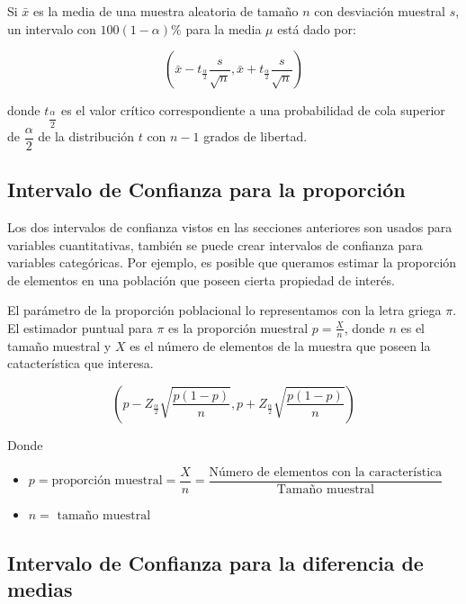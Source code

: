 \documentclass[letterpaper,]{book}
\begin{document}
Si \(\bar{x}\) es la media de una muestra aleatoria de tamaño \(n\) con desviación muestral \(s\), un intervalo con \(100\left(1-\alpha\right)\%\) para la media \(\mu\) está dado por:

\begin{equation} 
  \left(\bar{x} - t_{\frac{\alpha}{2}}\dfrac{s}{\sqrt{n}}, \bar{x} + t_{\frac{\alpha}{2}}\dfrac{s}{\sqrt{n}}  \right)
  \label{eq:icmusd}
\end{equation}

donde \(t_{\dfrac{\alpha}{2}}\) es el valor crítico correspondiente a una probabilidad de cola superior de \(\dfrac{\alpha}{2}\) de la distribución \(t\) con \(n-1\) grados de libertad.

\hypertarget{intervalo-de-confianza-para-la-proporcion}{%
\subsection{Intervalo de Confianza para la proporción}\label{intervalo-de-confianza-para-la-proporcion}}

Los dos intervalos de confianza vistos en las secciones anteriores son usados para variables cuantitativas, también se puede crear intervalos de confianza para variables categóricas. Por ejemplo, es posible que queramos estimar la proporción de elementos en una población que poseen cierta propiedad de interés.

El parámetro de la proporción poblacional lo representamos con la letra griega \(\pi\). El estimador puntual para \(\pi\) es la proporción muestral \(p=\frac{X}{n}\), donde \(n\) es el tamaño muestral y \(X\) es el número de elementos de la muestra que poseen la catacterística que interesa.

\begin{equation} 
  \left(p - Z_{\frac{\alpha}{2}}\sqrt{\dfrac{p\left(1-p\right)}{n}}, p + Z_{\frac{\alpha}{2}}\sqrt{\dfrac{p\left(1-p\right)}{n}}  \right)
  \label{eq:icprop}
\end{equation}

Donde

\begin{itemize}
\item
  \(p=\text{proporción muestral}=\dfrac{X}{n} =\dfrac{\text{Número de elementos con la característica}}{\text{Tamaño muestral}}\)
\item
  \(n= \text{ tamaño muestral}\)
\end{itemize}

\hypertarget{intervalo-de-confianza-para-la-diferencia-de-medias}{%
\subsection{Intervalo de Confianza para la diferencia de medias}\label{intervalo-de-confianza-para-la-diferencia-de-medias}}
\end{document}
